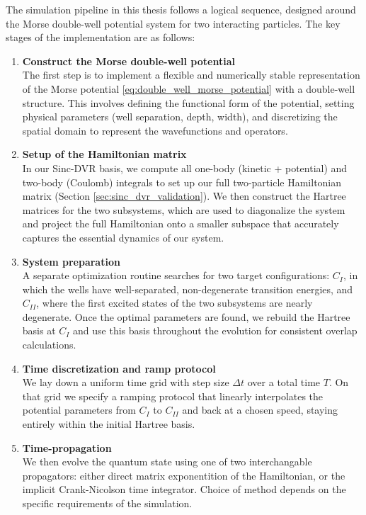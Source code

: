 \documentclass{subfiles}
\begin{document}
The simulation pipeline in this thesis follows a logical sequence, designed around the Morse double-well potential system for two interacting particles. The key stages of the implementation are as follows:
\begin{enumerate}
    \item \textbf{Construct the Morse double-well potential} \\
    The first step is to implement a flexible and numerically stable representation of the Morse potential \eqref{eq:double_well_morse_potential} with a double-well structure. This involves defining the functional form of the potential, setting physical parameters (well separation, depth, width), and discretizing the spatial domain to represent the wavefunctions and operators. 

    \item \textbf{Setup of the Hamiltonian matrix} \\
    In our Sinc-DVR basis, we compute all one-body (kinetic + potential) and two-body (Coulomb) integrals to set up our full two-particle Hamiltonian matrix (Section \ref{sec:sinc_dvr_validation}). We then construct the Hartree matrices for the two subsystems, which are used to diagonalize the system and project the full Hamiltonian onto a smaller subspace that accurately captures the essential dynamics of our system.

    \item \textbf{System preparation} \\
    A separate optimization routine searches for two target configurations: $C_I$, in which the wells have well-separated, non-degenerate transition energies, and $C_{II}$, where the first excited states of the two subsystems are nearly degenerate. Once the optimal parameters are found, we rebuild the Hartree basis at $C_I$ and use this basis throughout the evolution for consistent overlap calculations.

    \item \textbf{Time discretization and ramp protocol} \\
    We lay down a uniform time grid with step size $\Delta t$ over a total time $T$. On that grid we specify a ramping protocol that linearly interpolates the potential parameters from $C_I$ to $C_{II}$ and back at a chosen speed, staying entirely within the initial Hartree basis. 

    \item \textbf{Time-propagation} \\
    We then evolve the quantum state using one of two interchangable propagators: either direct matrix exponentition of the Hamiltonian, or the implicit Crank-Nicolson time integrator. Choice of method depends on the specific requirements of the simulation.


\end{enumerate}
\end{document}

